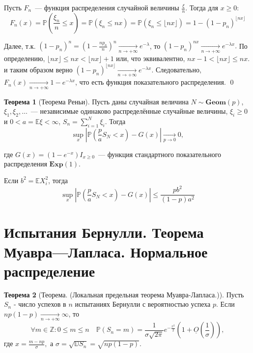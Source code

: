 \documentclass[oneside,final,14pt]{extreport}
\renewenvironment{proof}{{\bfseries Доказательство.}}{\qed}
\theoremstyle{plain}
\theoremstyle{definition}
\theoremstyle{named}
\newtheorem*{namedthm}{Теорема}
\begin{document}
\begin{proof}
    Пусть $F_n$~--- функция распределения случайной величины $\frac{\xi}{n}$. Тогда для $x \geqslant 0$:
    \begin{equation*}
        F_{n}(x)=\mathbb{P}\left(\frac{\xi_{n}}{n} \leqslant x\right)=\mathbb{P}\left(\xi_{n} \leqslant n x\right)=\mathbb{P}\left(\xi_{n} \leq\lfloor n x\rfloor\right)=1-\left(1-p_{n}\right)^{\lfloor n x\rfloor}
    \end{equation*}
    
    Далее, т.к. $\left(1-p_{n}\right)^{n}=\left(1-\frac{n p_{n}}{n}\right)^{n} \xrightarrow[n \to +\infty]{} e^{-\lambda}$, то $(1 - p_n)^{nx} \xrightarrow[n \to +\infty]{} e^{-\lambda x}.$ По определению, $\lfloor n x\rfloor \leqslant n x<\lfloor n x\rfloor+1$ или, что эквивалентно, $n x-1<\lfloor n x\rfloor \leqslant n x.$ и таким образом верно $(1 - p_n)^{\lfloor nx \rfloor} \xrightarrow[n \to +\infty]{} e^{-\lambda x}$. Следовательно, $F_n(x) \xrightarrow[n \to +\infty]{} 1 - e^{-\lambda x}$, что есть функция показательного распределения. 
\end{proof}

\begin{namedthm}[Теорема Реньи]
Пусть даны случайная величина $N \sim \mathbf{Geom}(p)$, $\xi_1, \xi_2, \ldots$~--- независимые одинаково распределённые случайные величины, $\xi_i \geqslant 0$ и $0 < a = \mathbb{E}\xi < \infty$, $S_n = \sum\limits_{i=1}^N \xi_i$. Тогда
\begin{equation*}
    \sup\limits_{x}\left|\mathbb{P}\left(\frac{p}{a} S_{N}<x\right)-G(x)\right| \underset{p \rightarrow 0}{\longrightarrow} 0,
\end{equation*}

где $G(x)=\left(1-e^{-x}\right) I_{x \geqslant 0}$~--- функция стандартного показательного распределения $\mathbf{Exp}(1)$.

Если $b^2 = \mathbb{E}X_i^2$, тогда
\begin{equation*}
    \sup\limits_{x}\left|\mathbb{P}\left(\frac{p}{a} S_{N}<x\right)-G(x)\right| \leqslant \frac{p b^{2}}{(1-p) a^{2}}
\end{equation*}
\end{namedthm}

\section{Испытания Бернулли. Теорема Муавра—Лапласа. Нормальное распределение}

\begin{namedthm} [Теорема. (Локальная предельная теорема Муавра-Лапласа.)]
    Пусть $S_n$ - число успехов в $n$ испытаниях Бернулли с вероятностью успеха $p$. Если $n p(1-p) \underset{n \to +\infty}{\longrightarrow} \infty$, то
$$\forall m \in \mathbb{Z}: 0 \leqslant m \leqslant n \quad \mathbb{P}\left(S_{n}=m\right)=\frac{1}{\sigma \sqrt{2 \pi} } e^{-\frac{x^{2}}{2}}\left(1+\underline{O}\left(\frac{1}{\sigma}\right)\right),$$
где $x = \frac{m - np}{\sigma},$ а $\sigma=\sqrt{\mathbb{D} S_{n}}=\sqrt{n p(1-p)}$.
\end{namedthm}  
\end{document}
